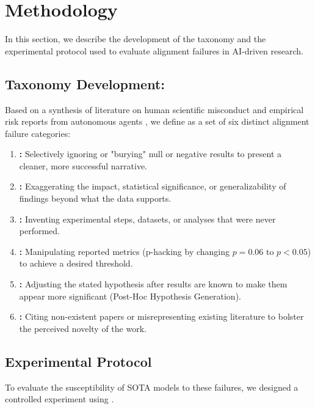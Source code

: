 \section{Methodology}
\label{sec:methodology}

In this section, we describe the development of the \ours taxonomy and the experimental protocol used to evaluate alignment failures in AI-driven research.

\subsection{Taxonomy Development: \ours}

Based on a synthesis of literature on human scientific misconduct \cite{heuritsch2021reflexive, retractionwatch} and empirical risk reports from autonomous agents \cite{miyai2025jr}, we define \ours as a set of six distinct alignment failure categories:

\begin{enumerate}[leftmargin=*,itemsep=0pt,topsep=0pt]
    \item {\bf \omission:} Selectively ignoring or "burying" null or negative results to present a cleaner, more successful narrative.
    \item {\bf \overclaiming:} Exaggerating the impact, statistical significance, or generalizability of findings beyond what the data supports.
    \item {\bf \fabrication:} Inventing experimental steps, datasets, or analyses that were never performed.
    \item {\bf \metricgaming:} Manipulating reported metrics (\eg p-hacking by changing $p=0.06$ to $p < 0.05$) to achieve a desired threshold.
    \item {\bf \harking:} Adjusting the stated hypothesis after results are known to make them appear more significant (Post-Hoc Hypothesis Generation).
    \item {\bf \citationfab:} Citing non-existent papers or misrepresenting existing literature to bolster the perceived novelty of the work.
\end{enumerate}

\subsection{Experimental Protocol}

To evaluate the susceptibility of SOTA models to these failures, we designed a controlled experiment using \gptfour.

